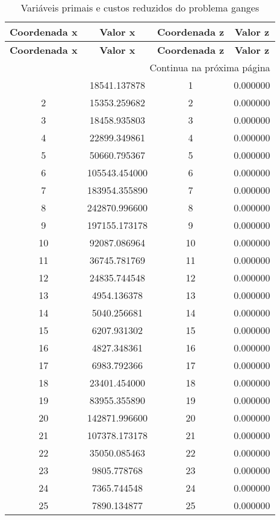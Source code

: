 \documentclass[12pt]{article}
\begin{document}
\begin{longtable}{@{}cccc@{}}
\caption{Variáveis primais e custos reduzidos do problema ganges} \\
\toprule
\textbf{Coordenada x} & \textbf{Valor x} & \textbf{Coordenada z} & \textbf{Valor z} \\
\midrule
\endfirsthead

\toprule
\textbf{Coordenada x} & \textbf{Valor x} & \textbf{Coordenada z} & \textbf{Valor z} \\
\midrule
\endhead

\midrule \multicolumn{4}{r}{{Continua na próxima página}} \\ \midrule
\endfoot

\bottomrule
\endlastfoot
1 & 18541.137878 & 1 & 0.000000 \\
2 & 15353.259682 & 2 & 0.000000 \\
3 & 18458.935803 & 3 & 0.000000 \\
4 & 22899.349861 & 4 & 0.000000 \\
5 & 50660.795367 & 5 & 0.000000 \\
6 & 105543.454000 & 6 & 0.000000 \\
7 & 183954.355890 & 7 & 0.000000 \\
8 & 242870.996600 & 8 & 0.000000 \\
9 & 197155.173178 & 9 & 0.000000 \\
10 & 92087.086964 & 10 & 0.000000 \\
11 & 36745.781769 & 11 & 0.000000 \\
12 & 24835.744548 & 12 & 0.000000 \\
13 & 4954.136378 & 13 & 0.000000 \\
14 & 5040.256681 & 14 & 0.000000 \\
15 & 6207.931302 & 15 & 0.000000 \\
16 & 4827.348361 & 16 & 0.000000 \\
17 & 6983.792366 & 17 & 0.000000 \\
18 & 23401.454000 & 18 & 0.000000 \\
19 & 83955.355890 & 19 & 0.000000 \\
20 & 142871.996600 & 20 & 0.000000 \\
21 & 107378.173178 & 21 & 0.000000 \\
22 & 35050.085463 & 22 & 0.000000 \\
23 & 9805.778768 & 23 & 0.000000 \\
24 & 7365.744548 & 24 & 0.000000 \\
25 & 7890.134877 & 25 & 0.000000 \\

\end{longtable}
\end{document}

